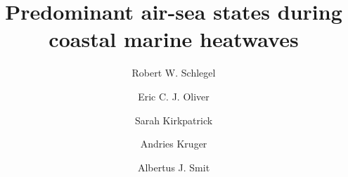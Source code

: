 \documentclass[a4paper,10pt,review]{elsarticle}
\begin{document}
\begin{frontmatter}

\title{Predominant air-sea states during coastal marine heatwaves}

\author[firstaddress]{Robert W. Schlegel}
\author[secondaddress,thirdaddress,fourthaddress]{Eric C. J. Oliver}
\author[fifthaddress]{Sarah Kirkpatrick}
\author[sixthaddress,seventhaddress]{Andries Kruger}
\author[firstaddress]{Albertus J. Smit}


\address[firstaddress]{Department of Biodiversity and Conservation Biology, University of the Western Cape, Private Bag X17, Bellville 7535, South Africa}

\address[secondaddress]{ARC Centre of Excellence for Climate System Science, Australia}

\address[thirdaddress]{Institute for Marine and Antarctic Studies, University of Tasmania, Hobart, Australia}

\address[fourthaddress]{Department of Oceanography, Dalhousie University, Halifax, Nova Scotia, Canada}

\address[fifthaddress]{UWA Oceans Institute and School of Plant Biology, The University of Western Australia, Crawley, 6009 Western Australia, Australia}

\address[sixthaddress]{Climate Service, South African Weather Service, Pretoria, South Africa}

\address[seventhaddress]{Department of Geography, Geoinformatics and Meteorology, Faculty of Natural and Agricultural Sciences, University of Pretoria, South Africa}



\end{frontmatter}
\end{document}
